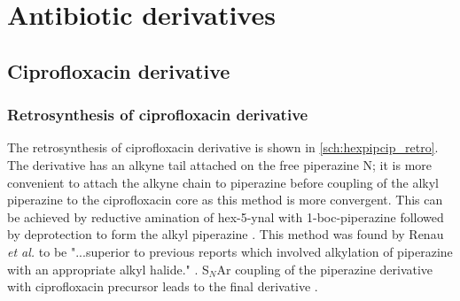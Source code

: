 \section{Antibiotic derivatives}

\subsection{Ciprofloxacin derivative}




\subsubsection{Retrosynthesis of ciprofloxacin derivative }

The retrosynthesis of ciprofloxacin derivative  is shown in \ref{sch:hexpipcip_retro}.
The derivative has an alkyne tail attached on the free piperazine N; it is more convenient to attach the alkyne chain to piperazine before coupling of the alkyl piperazine  to the ciprofloxacin core  as this method is more convergent. This can be achieved by reductive amination of hex-5-ynal  with 1-boc-piperazine  followed by deprotection to form the alkyl piperazine . This method was found by Renau \textit{et al.} to be "...superior to previous reports which involved alkylation of piperazine with an appropriate alkyl halide." \cite{Renau1996,JPS:JPS2600571210}. 
S$_N$Ar coupling of the piperazine derivative with ciprofloxacin precursor  leads to the final derivative .

